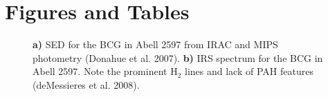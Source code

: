 \documentclass[letterpaper,12pt]{article}
\begin{document}
\section{Figures and Tables}
\begin{figure}[t]
  \centering
  \caption{\small
           {\bf a)} SED for the BCG in Abell 2597 from IRAC
            and MIPS photometry (Donahue et al. 2007). 
           {\bf b)} IRS spectrum for the BCG in Abell 2597. Note the
            prominent H$_2$ lines and lack of PAH features
            (deMessieres et al. 2008).}
\end{figure}
\end{document}
